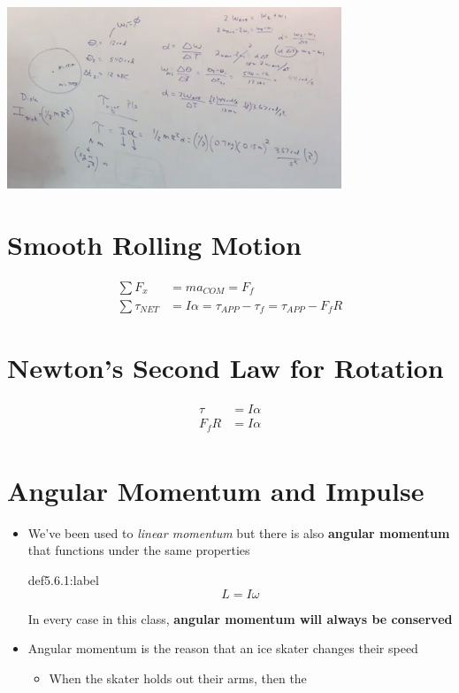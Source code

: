 \begin{problem}
    \begin{center}
        \includegraphics[width=0.75\textwidth]{chapters/ch5/images/fig5_2.PNG}
    \end{center}
\end{problem}


\section{Smooth Rolling Motion}

\[
\begin{aligned}
    \sum F_x  &= ma_{COM} = F_f\\
    \sum \tau_{NET} &= I\alpha = \tau_{APP} - \tau_f = \tau_{APP} - F_fR
\end{aligned}    
\]



\section{Newton's Second Law for Rotation}

\[
\begin{aligned}
    \tau &= I\alpha\\
    F_fR &= I\alpha\\
\end{aligned}    
\]


\section{Angular Momentum and Impulse}

\begin{itemize}
    \item We've been used to \textit{linear momentum} but there is also \textbf{angular momentum} that functions under the same properties
    
    \begin{definition}{def5.6.1:label}
        \[
        L = I\omega     
        \]

        In every case in this class, \textbf{angular momentum will always be conserved}
    \end{definition}

    \item Angular momentum is the reason that an ice skater changes their speed
    \begin{itemize}
        \item When the skater holds out their arms, then the 
    \end{itemize}
\end{itemize}

